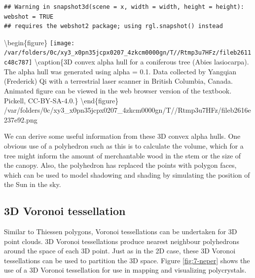 \documentclass[
]{book}
\begin{document}
\begin{verbatim}
## Warning in snapshot3d(scene = x, width = width, height = height): webshot = TRUE
## requires the webshot2 package; using rgl.snapshot() instead
\end{verbatim}

\textbackslash begin\{figure\}
\texttt{[image: /var/folders/0c/xy3\_x0pn35jcpx0207\_4zkcm0000gn/T//Rtmp3u7HFz/fileb2611c48c787]} \textbackslash caption\{3D convex alpha hull for a coniferous tree (Abies lasiocarpa). The alpha hull was generated using alpha = 0.1. Data collected by Yangqian (Frederick) Qi with a terrestrial laser scanner in British Columbia, Canada. Animated figure can be viewed in the web browser version of the textbook. Pickell, CC-BY-SA-4.0.\}\label{fig:7-3d-alpha-hull-conifer}
\textbackslash end\{figure\}
/var/folders/0c/xy3\_x0pn35jcpx0207\_4zkcm0000gn/T//Rtmp3u7HFz/fileb2616e237e92.png

We can derive some useful information from these 3D convex alpha hulls. One obvious use of a polyhedron such as this is to calculate the volume, which for a tree might inform the amount of merchantable wood in the stem or the size of the canopy. Also, the polyhedron has replaced the points with polygon faces, which can be used to model shadowing and shading by simulating the position of the Sun in the sky.

\hypertarget{d-voronoi-tessellation}{%
\subsection{3D Voronoi tessellation}\label{d-voronoi-tessellation}}

Similar to Thiessen polygons, Voronoi tessellations can be undertaken for 3D point clouds. 3D Voronoi tessellations produce nearest neighbour polyhedrons around the space of each 3D point. Just as in the 2D case, these 3D Voronoi tessellations can be used to partition the 3D space. Figure \ref{fig:7-neper} shows the use of a 3D Voronoi tessellation for use in mapping and visualizing polycrystals.
\end{document}
